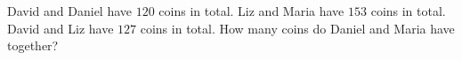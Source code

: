 David and Daniel have $120$ coins in total. Liz and Maria have $153$ coins in total. David and Liz have $127$ coins in total. How many coins do Daniel and Maria have together?
